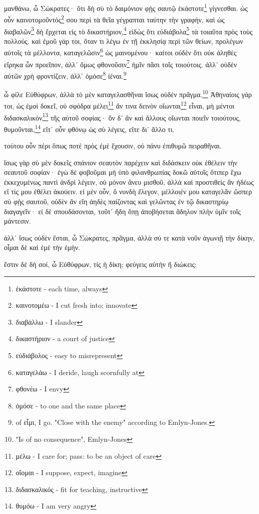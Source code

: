 μανθάνω,
ὦ
Σώκρατες·
ὅτι
δὴ
σὺ
τὸ
δαιμόνιον
φῂς
σαυτῷ
ἑκάστοτε\footnote{ἑκάστοτε - each time, always}
γίγνεσθαι.
ὡς
οὖν
καινοτομοῦντός\footnote{καινοτομέω - I cut fresh into; innovate}
σου
περὶ
τὰ
θεῖα
γέγραπται
ταύτην
τὴν
γραφήν,
καὶ
ὡς
διαβαλῶν\footnote{διαβάλλω - I slander}
δὴ
ἔρχεται
εἰς
τὸ
δικαστήριον,\footnote{δικαστήριον - a court of justice}
εἰδὼς
ὅτι
εὐδιάβολα\footnote{εὐδιάβολος - easy to misrepresent}
τὰ
τοιαῦτα
πρὸς
τοὺς
πολλούς.
καὶ
ἐμοῦ
γάρ
τοι,
\versification{[3c]}
ὅταν
τι
λέγω
ἐν
τῇ
ἐκκλησίᾳ
περὶ
τῶν
θείων,
προλέγων
αὐτοῖς
τὰ
μέλλοντα,
καταγελῶσιν\footnote{καταγελάω - I deride, laugh scornfully at}
ὡς
μαινομένου·
καίτοι
οὐδὲν
ὅτι
οὐκ
ἀληθὲς
εἴρηκα
ὧν
προεῖπον,
ἀλλ᾽
ὅμως
φθονοῦσιν\footnote{φθονέω - I envy}
ἡμῖν
πᾶσι
τοῖς
τοιούτοις.
ἀλλ᾽
οὐδὲν
αὐτῶν
χρὴ
φροντίζειν,
ἀλλ᾽
ὁμόσε\footnote{ὁμόσε - to one and the same place}
ἰέναι.\footnote{ of εἶμι, I go. "Close with the enemy" according to Emlyn-Jones.}

ὦ
φίλε
Εὐθύφρων,
ἀλλὰ
τὸ
μὲν
καταγελασθῆναι
ἴσως
οὐδὲν
πρᾶγμα.\footnote{"Is of no consequence", Emlyn-Jones}
Ἀθηναίοις
γάρ
τοι,
ὡς
ἐμοὶ
δοκεῖ,
οὐ
σφόδρα
μέλει\footnote{μέλω - I care for; pass: to be an object of care}
ἄν
τινα
δεινὸν
οἴωνται\footnote{οἴομαι - I suppose, expect, imagine}
εἶναι,
μὴ
μέντοι
διδασκαλικὸν\footnote{διδασκαλικός - fit for teaching, instructive}
τῆς
αὑτοῦ
σοφίας·
ὃν
δ᾽
ἂν
καὶ
ἄλλους
οἴωνται
\versification{[3d]}
ποιεῖν
τοιούτους,
θυμοῦνται,\footnote{θυμόω - I am very angry}
εἴτ᾽
οὖν
φθόνῳ
ὡς
σὺ
λέγεις,
εἴτε
δι᾽
ἄλλο
τι.

τούτου
οὖν
πέρι
ὅπως
ποτὲ
πρὸς
ἐμὲ
ἔχουσιν,
οὐ
πάνυ
ἐπιθυμῶ
πειραθῆναι.

ἴσως
γὰρ
σὺ
μὲν
δοκεῖς
σπάνιον
σεαυτὸν
παρέχειν
καὶ
διδάσκειν
οὐκ
ἐθέλειν
τὴν
σεαυτοῦ
σοφίαν·
ἐγὼ
δὲ
φοβοῦμαι
μὴ
ὑπὸ
φιλανθρωπίας
δοκῶ
αὐτοῖς
ὅτιπερ
ἔχω
ἐκκεχυμένως
παντὶ
ἀνδρὶ
λέγειν,
οὐ
μόνον
ἄνευ
μισθοῦ,
ἀλλὰ
καὶ
προστιθεὶς
ἂν
ἡδέως
εἴ
τίς
μου
ἐθέλει
ἀκούειν.
εἰ
μὲν
οὖν,
ὃ
νυνδὴ
ἔλεγον,
μέλλοιέν
μου
καταγελᾶν
ὥσπερ
\versification{[3e]}
σὺ
φῂς
σαυτοῦ,
οὐδὲν
ἂν
εἴη
ἀηδὲς
παίζοντας
καὶ
γελῶντας
ἐν
τῷ
δικαστηρίῳ
διαγαγεῖν·
εἰ
δὲ
σπουδάσονται,
τοῦτ᾽
ἤδη
ὅπῃ
ἀποβήσεται
ἄδηλον
πλὴν
ὑμῖν
τοῖς
μάντεσιν.

ἀλλ᾽
ἴσως
οὐδὲν
ἔσται,
ὦ
Σώκρατες,
πρᾶγμα,
ἀλλὰ
σύ
τε
κατὰ
νοῦν
ἀγωνιῇ
τὴν
δίκην,
οἶμαι
δὲ
καὶ
ἐμὲ
τὴν
ἐμήν.

ἔστιν
δὲ
δὴ
σοί,
ὦ
Εὐθύφρων,
τίς
ἡ
δίκη;
φεύγεις
αὐτὴν
ἢ
διώκεις;

